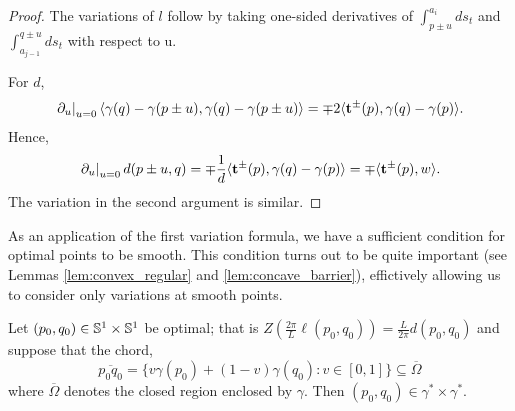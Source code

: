 \documentclass[11pt]{amsart}
\begin{document}
\begin{proof}
The variations of \(l\) follow by taking one-sided derivatives of \(\int_{p\pm u}^{a_i} ds_t\) and \(\int_{a_{j-1}}^{q \pm u} ds_t\) with respect to u.

For \(d\),
\[
\left.\partial_u\right|_{u=0} \langle{\gamma(q) - \gamma(p \pm u)},{\gamma(q) - \gamma(p \pm u)}\rangle = \mp 2 \langle{\operatorname{\mathbf{t}}^{\pm}(p)},{\gamma(q) - \gamma(p)}\rangle.
\]
Hence,
\[
\left.\partial_u\right|_{u=0} d (p \pm u, q) =  \mp \frac{1}{d} \langle{\operatorname{\mathbf{t}}^{\pm}(p)},{\gamma(q) - \gamma(p)}\rangle = \mp \langle{\operatorname{\mathbf{t}}^{\pm}(p)},{w}\rangle.
\]
The variation in the second argument is similar.
\end{proof}

As an application of the first variation formula, we have a sufficient condition for optimal points to be smooth. This condition turns out to be quite important (see Lemmas \ref{lem:convex_regular} and \ref{lem:concave_barrier}), effictively allowing us to consider only variations at smooth points.

\begin{lemma}
\label{lem:optimum_are_regular}

Let \((p_0,q_0) \in \mathbb{S}^1 \times \mathbb{S}^1\) be optimal; that is \(Z(\tfrac{2\pi}{L}\ell(p_0,q_0)) = \tfrac{L}{2\pi} d(p_0, q_0)\) and suppose that the chord,
\[
\overline{p_0 q_0} = \{v \gamma(p_0) + (1-v) \gamma(q_0) : v \in [0, 1]\} \subseteq \overline{\Omega}
\]
where \(\overline{\Omega}\) denotes the closed region enclosed by \(\gamma\). Then \((p_0, q_0) \in \gamma^{\ast} \times \gamma^{\ast}\).
\end{lemma}
\end{document}
